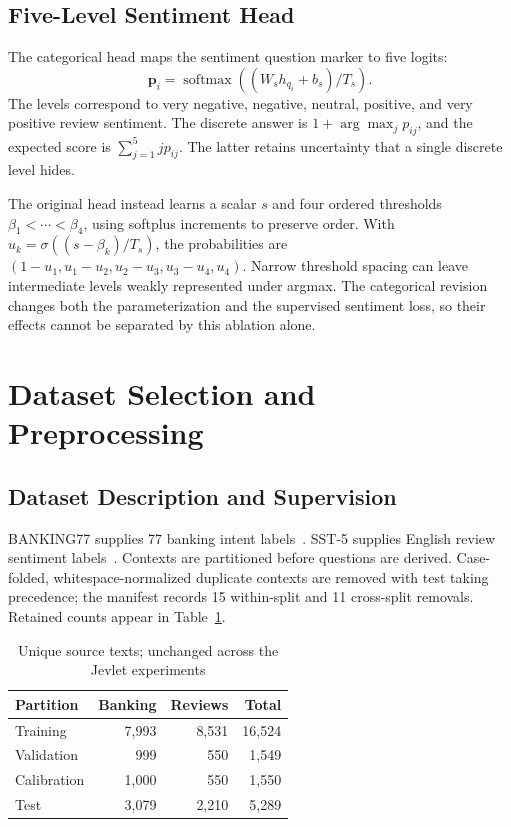 \documentclass[conference]{IEEEtran}
\begin{document}
\subsection{Five-Level Sentiment Head}
The categorical head maps the sentiment question marker to five logits:
\begin{equation}
\boldsymbol{p}_i=\operatorname{softmax}((W_s h_{q_i}+b_s)/T_s).
\end{equation}
The levels correspond to very negative, negative, neutral, positive, and very positive review sentiment. The discrete answer is $1+\arg\max_j p_{ij}$, and the expected score is $\sum_{j=1}^{5}j p_{ij}$. The latter retains uncertainty that a single discrete level hides.

The original head instead learns a scalar $s$ and four ordered thresholds $\beta_1<\cdots<\beta_4$, using softplus increments to preserve order. With $u_k=\sigma((s-\beta_k)/T_s)$, the probabilities are $(1-u_1,u_1-u_2,u_2-u_3,u_3-u_4,u_4)$. Narrow threshold spacing can leave intermediate levels weakly represented under argmax. The categorical revision changes both the parameterization and the supervised sentiment loss, so their effects cannot be separated by this ablation alone.

\section{Dataset Selection and Preprocessing}
\subsection{Dataset Description and Supervision}
BANKING77 supplies 77 banking intent labels~\cite{banking}. SST-5 supplies English review sentiment labels~\cite{sst}. Contexts are partitioned before questions are derived. Case-folded, whitespace-normalized duplicate contexts are removed with test taking precedence; the manifest records 15 within-split and 11 cross-split removals. Retained counts appear in Table~\ref{tab:data}.

\begin{table}[t]
\caption{Unique source texts; unchanged across the Jevlet experiments}
\label{tab:data}\centering
\begin{tabular}{lrrr}\toprule
Partition & Banking & Reviews & Total\\\midrule
Training & 7,993 & 8,531 & 16,524\\
Validation & 999 & 550 & 1,549\\
Calibration & 1,000 & 550 & 1,550\\
Test & 3,079 & 2,210 & 5,289\\\bottomrule
\end{tabular}\end{table}
\end{document}
